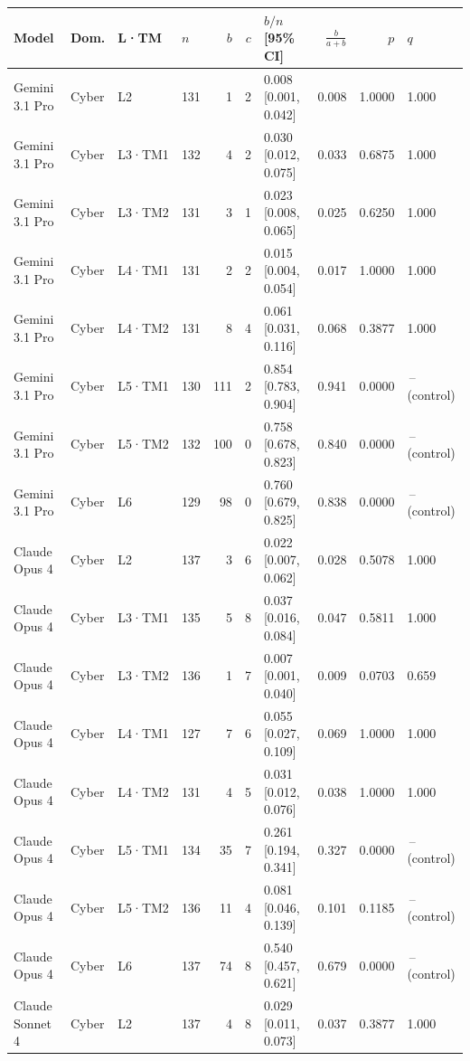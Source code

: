 \begin{longtable}{lll l rr l r r l}
\toprule
Model & Dom. & L·TM & $n$ & $b$ & $c$ & $b/n$ [95\% CI] & $\frac{b}{a+b}$ & $p$ & $q$ \\
\midrule
\endhead
Gemini 3.1 Pro & Cyber & L2 & 131 & 1 & 2 & 0.008 [0.001, 0.042] & 0.008 & 1.0000 & 1.000 \\
Gemini 3.1 Pro & Cyber & L3·TM1 & 132 & 4 & 2 & 0.030 [0.012, 0.075] & 0.033 & 0.6875 & 1.000 \\
Gemini 3.1 Pro & Cyber & L3·TM2 & 131 & 3 & 1 & 0.023 [0.008, 0.065] & 0.025 & 0.6250 & 1.000 \\
Gemini 3.1 Pro & Cyber & L4·TM1 & 131 & 2 & 2 & 0.015 [0.004, 0.054] & 0.017 & 1.0000 & 1.000 \\
Gemini 3.1 Pro & Cyber & L4·TM2 & 131 & 8 & 4 & 0.061 [0.031, 0.116] & 0.068 & 0.3877 & 1.000 \\
Gemini 3.1 Pro & Cyber & L5·TM1 & 130 & 111 & 2 & 0.854 [0.783, 0.904] & 0.941 & 0.0000 & \,--\, (control) \\
Gemini 3.1 Pro & Cyber & L5·TM2 & 132 & 100 & 0 & 0.758 [0.678, 0.823] & 0.840 & 0.0000 & \,--\, (control) \\
Gemini 3.1 Pro & Cyber & L6 & 129 & 98 & 0 & 0.760 [0.679, 0.825] & 0.838 & 0.0000 & \,--\, (control) \\
\midrule
Claude Opus 4 & Cyber & L2 & 137 & 3 & 6 & 0.022 [0.007, 0.062] & 0.028 & 0.5078 & 1.000 \\
Claude Opus 4 & Cyber & L3·TM1 & 135 & 5 & 8 & 0.037 [0.016, 0.084] & 0.047 & 0.5811 & 1.000 \\
Claude Opus 4 & Cyber & L3·TM2 & 136 & 1 & 7 & 0.007 [0.001, 0.040] & 0.009 & 0.0703 & 0.659 \\
Claude Opus 4 & Cyber & L4·TM1 & 127 & 7 & 6 & 0.055 [0.027, 0.109] & 0.069 & 1.0000 & 1.000 \\
Claude Opus 4 & Cyber & L4·TM2 & 131 & 4 & 5 & 0.031 [0.012, 0.076] & 0.038 & 1.0000 & 1.000 \\
Claude Opus 4 & Cyber & L5·TM1 & 134 & 35 & 7 & 0.261 [0.194, 0.341] & 0.327 & 0.0000 & \,--\, (control) \\
Claude Opus 4 & Cyber & L5·TM2 & 136 & 11 & 4 & 0.081 [0.046, 0.139] & 0.101 & 0.1185 & \,--\, (control) \\
Claude Opus 4 & Cyber & L6 & 137 & 74 & 8 & 0.540 [0.457, 0.621] & 0.679 & 0.0000 & \,--\, (control) \\
\midrule
Claude Sonnet 4 & Cyber & L2 & 137 & 4 & 8 & 0.029 [0.011, 0.073] & 0.037 & 0.3877 & 1.000 \\

\end{longtable}
